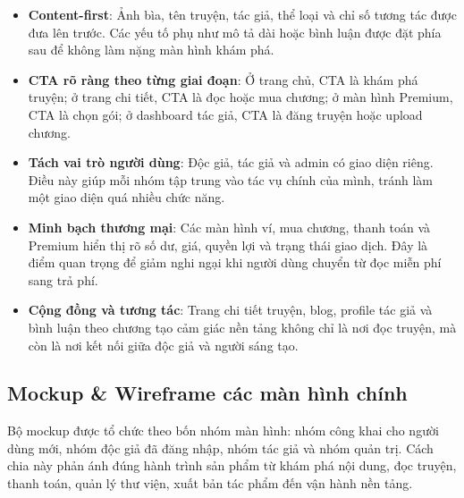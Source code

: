 \begin{itemize}
    \item \textbf{Content-first}: Ảnh bìa, tên truyện, tác giả, thể loại và chỉ số tương tác được đưa lên trước. Các yếu tố phụ như mô tả dài hoặc bình luận được đặt phía sau để không làm nặng màn hình khám phá.
    \item \textbf{CTA rõ ràng theo từng giai đoạn}: Ở trang chủ, CTA là khám phá truyện; ở trang chi tiết, CTA là đọc hoặc mua chương; ở màn hình Premium, CTA là chọn gói; ở dashboard tác giả, CTA là đăng truyện hoặc upload chương.
    \item \textbf{Tách vai trò người dùng}: Độc giả, tác giả và admin có giao diện riêng. Điều này giúp mỗi nhóm tập trung vào tác vụ chính của mình, tránh làm một giao diện quá nhiều chức năng.
    \item \textbf{Minh bạch thương mại}: Các màn hình ví, mua chương, thanh toán và Premium hiển thị rõ số dư, giá, quyền lợi và trạng thái giao dịch. Đây là điểm quan trọng để giảm nghi ngại khi người dùng chuyển từ đọc miễn phí sang trả phí.
    \item \textbf{Cộng đồng và tương tác}: Trang chi tiết truyện, blog, profile tác giả và bình luận theo chương tạo cảm giác nền tảng không chỉ là nơi đọc truyện, mà còn là nơi kết nối giữa độc giả và người sáng tạo.
\end{itemize}

\subsection{Mockup \& Wireframe các màn hình chính}

Bộ mockup được tổ chức theo bốn nhóm màn hình: nhóm công khai cho người dùng mới, nhóm độc giả đã đăng nhập, nhóm tác giả và nhóm quản trị. Cách chia này phản ánh đúng hành trình sản phẩm từ khám phá nội dung, đọc truyện, thanh toán, quản lý thư viện, xuất bản tác phẩm đến vận hành nền tảng.

